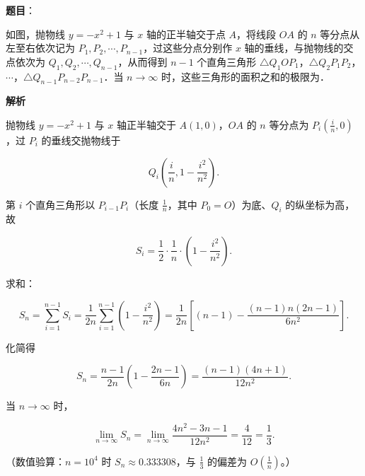\begin{answer}

\textbf{题目}：

如图，抛物线 $y=-x^2+1$ 与 $x$ 轴的正半轴交于点 $A$，将线段 $OA$ 的 $n$ 等分点从左至右依次记为 $P_1,P_2,\cdots,P_{n-1}$，过这些分点分别作 $x$ 轴的垂线，与抛物线的交点依次为 $Q_1,Q_2,\cdots,Q_{n-1}$，从而得到 $n-1$ 个直角三角形 $\triangle Q_1OP_1$，$\triangle Q_2P_1P_2$，$\cdots$，$\triangle Q_{n-1}P_{n-2}P_{n-1}$．当 $n\to\infty$ 时，这些三角形的面积之和的极限为\gkblank{}．
\nopagebreak[4]
\begin{center}\end{center}
\nopagebreak[4]
\textbf{解析}

抛物线 $y=-x^2+1$ 与 $x$ 轴正半轴交于 $A(1,0)$，$OA$ 的 $n$ 等分点为 $P_i\left(\frac in,0\right)$，过 $P_i$ 的垂线交抛物线于

\nopagebreak[4]
\[Q_i\left(\frac in,1-\frac{i^2}{n^2}\right).\]

第 $i$ 个直角三角形以 $P_{i-1}P_i$（长度 $\frac1n$，其中 $P_0=O$）为底、$Q_i$ 的纵坐标为高，故

\nopagebreak[4]
\[S_i=\frac12\cdot\frac1n\cdot\left(1-\frac{i^2}{n^2}\right).\]

求和：

\nopagebreak[4]
\[S_n=\sum_{i=1}^{n-1}S_i=\frac{1}{2n}\sum_{i=1}^{n-1}\left(1-\frac{i^2}{n^2}\right)=\frac{1}{2n}\left[(n-1)-\frac{(n-1)n(2n-1)}{6n^2}\right].\]

化简得

\nopagebreak[4]
\[S_n=\frac{n-1}{2n}\left(1-\frac{2n-1}{6n}\right)=\frac{(n-1)(4n+1)}{12n^2}.\]

当 $n\to\infty$ 时，

\nopagebreak[4]
\[\lim_{n\to\infty}S_n=\lim_{n\to\infty}\frac{4n^2-3n-1}{12n^2}=\frac{4}{12}=\frac13.\]

（数值验算：$n=10^4$ 时 $S_n\approx0.333308$，与 $\frac13$ 的偏差为 $O\left(\frac1n\right)$。）


\end{answer}
